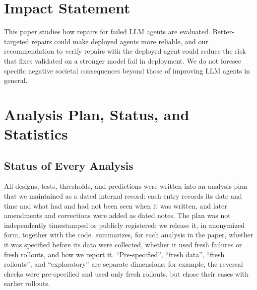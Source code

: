 \documentclass{article}
\theoremstyle{plain}
\theoremstyle{definition}
\theoremstyle{remark}
\begin{document}
\section*{Impact Statement}

This paper studies how repairs for failed LLM agents are evaluated. Better-targeted repairs could make deployed agents more reliable, and our recommendation to verify repairs with the deployed agent could reduce the risk that fixes validated on a stronger model fail in deployment. We do not foresee specific negative societal consequences beyond those of improving LLM agents in general.




\newpage
\appendix

\section{Analysis Plan, Status, and Statistics}
\label{app:plan}

\subsection{Status of Every Analysis}
\label{app:audit}

All designs, tests, thresholds, and predictions were written into an analysis plan that we maintained as a dated internal record: each entry records its date and time and what had and had not been seen when it was written, and later amendments and corrections were added as dated notes. The plan was not independently timestamped or publicly registered; we release it, in anonymized form, together with the code.  summarizes, for each analysis in the paper, whether it was specified before its data were collected, whether it used fresh failures or fresh rollouts, and how we report it. ``Pre-specified'', ``fresh data'', ``fresh rollouts'', and ``exploratory'' are separate dimensions: for example, the reversal checks were pre-specified and used only fresh rollouts, but chose their cases with earlier rollouts.
\end{document}
